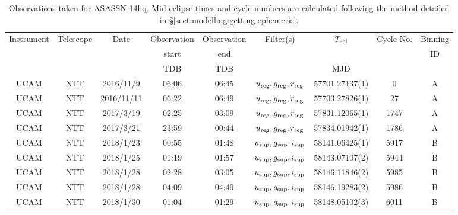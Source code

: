 \begin{table}
	\begin{center}
		\caption{Observations taken for ASASSN-14hq. Mid-eclipse times and cycle numbers are calculated following the method detailed in \S\ref{sect:modelling:getting ephemeris}.}
		\label{table:observing:observation logs ASASSN-14hq}
		\begin{tabular}{ccccccccc}
			\hline
			Instrument & Telescope & Date & Observation  & Observation  & Filter(s) & $T_{\rm ecl}$ & Cycle No. & Binning \\
			 &  &  &  start &  end &  &  &  & ID \\
			 &  &  & TDB & TDB &  & MJD &  &  \\
			\hline
			\hline
			 UCAM & NTT & 2016/11/9  & 06:06 & 06:45 & $u_{\rm reg},g_{\rm reg},r_{\rm reg}$ & 57701.27137(1) &    0 & A \\
			 UCAM & NTT & 2016/11/11 & 06:22 & 06:49 & $u_{\rm reg},g_{\rm reg},r_{\rm reg}$ & 57703.27826(1) &   27 & A \\
			 UCAM & NTT & 2017/3/19  & 02:25 & 03:09 & $u_{\rm reg},g_{\rm reg},r_{\rm reg}$ & 57831.12065(1) & 1747 & A \\
			 UCAM & NTT & 2017/3/21  & 23:59 & 00:44 & $u_{\rm reg},g_{\rm reg},r_{\rm reg}$ & 57834.01942(1) & 1786 & A \\
			 UCAM & NTT & 2018/1/23  & 00:55 & 01:48 & $u_{\rm sup},g_{\rm sup},i_{\rm sup}$ & 58141.06425(1) & 5917 & B \\
			 UCAM & NTT & 2018/1/25  & 01:19 & 01:57 & $u_{\rm sup},g_{\rm sup},i_{\rm sup}$ & 58143.07107(2) & 5944 & B \\
			 UCAM & NTT & 2018/1/28  & 02:28 & 03:05 & $u_{\rm sup},g_{\rm sup},i_{\rm sup}$ & 58146.11846(2) & 5985 & B \\
			 UCAM & NTT & 2018/1/28  & 04:09 & 04:49 & $u_{\rm sup},g_{\rm sup},i_{\rm sup}$ & 58146.19283(2) & 5986 & B \\
			 UCAM & NTT & 2018/1/30  & 01:04 & 01:29 & $u_{\rm sup},g_{\rm sup},i_{\rm sup}$ & 58148.05102(3) & 6011 & B \\
			\hline
			\end{tabular}
	\end{center}
\end{table}